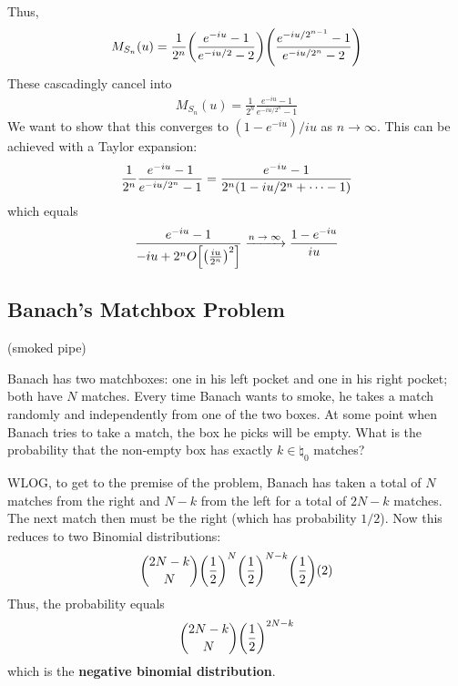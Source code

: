 \begin{solution}
    Thus,
    \begin{align}
        M_{S_n}(u) = \frac{1}{2^n} \qty(\frac{e^{-iu} - 1}{e^{-iu/2} - 2})\qty(\frac{e^{-iu/2^{n-1}} - 1}{e^{-iu/2^n} - 2})
    \end{align}
    These cascadingly cancel into
    \begin{align}
        M_{S_n}(u) = \frac{1}{2^n} \frac{e^{-iu} - 1}{e^{-iu/2^n} - 1}
    \end{align}
    We want to show that this converges to $(1 - e^{-iu})/iu$ as $n \to \infty$. This can be achieved with a Taylor expansion:
    \begin{align}
        \frac{1}{2^n}\frac{e^{-iu} - 1}{e^{-iu/2^n} - 1} = \frac{e^{-iu} - 1}{2^n\qty(1 - iu/2^n + \cdots - 1)}
    \end{align}
    which equals
    \begin{align}
        \frac{e^{-iu} - 1}{-iu + 2^nO\qty[\qty(\frac{iu}{2^n})^2]} \ce{->[$n \to \infty$]} \frac{1 - e^{-iu}}{iu}
    \end{align}
\end{solution}

\subsection{Banach's Matchbox Problem}
(smoked pipe)
\begin{proposition}
    Banach has two matchboxes: one in his left pocket and one in his right pocket; both have $N$ matches. Every time Banach wants to smoke, he takes a match randomly and independently from one of the two boxes. At some point when Banach tries to take a match, the box he picks will be empty. What is the probability that the non-empty box has exactly $k \in \natural_0$ matches?
\end{proposition}

\begin{solution}
    WLOG, to get to the premise of the problem, Banach has taken a total of $N$ matches from the right and $N - k$ from the left for a total of $2N - k$ matches. The next match then must be the right (which has probability $1/2$). Now this reduces to two Binomial distributions:
    \begin{align}
        \binom{2N - k}{N} \qty(\frac{1}{2})^N \qty(\frac{1}{2})^{N-k} \qty(\frac{1}{2})\qty(2)
    \end{align}
    Thus, the probability equals
    \begin{align}
        \binom{2N - k}{N}\qty(\frac{1}{2})^{2N - k}
    \end{align}
    which is the \textbf{negative binomial distribution}.
\end{solution}

